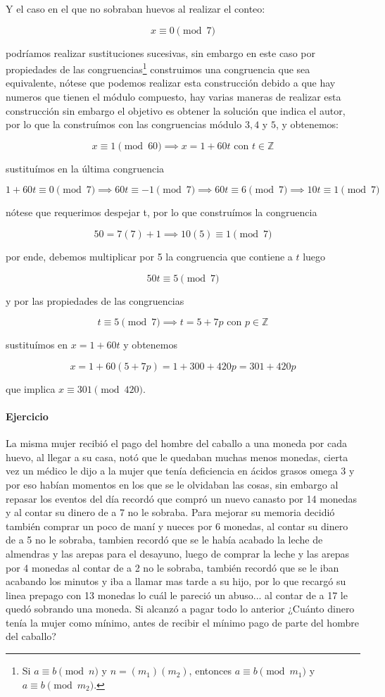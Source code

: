 \documentclass{article}
\begin{document}
	Y el caso en el que no sobraban huevos al realizar el conteo:
	
	$$x \equiv 0 \pmod{7}$$
	
	podríamos realizar sustituciones sucesivas, sin embargo en este caso por propiedades de las congruencias\footnote{Si $a \equiv b \pmod{n}$ y $n = (m_1)(m_2)$, entonces $a \equiv b \pmod{m_1}$ y $a \equiv b \pmod{m_2}$.} construimos una congruencia que sea equivalente, nótese que podemos realizar esta construcción debido a que hay numeros que tienen el módulo compuesto, hay varias maneras de realizar esta construcción sin embargo el objetivo es obtener la solución que indica el autor, por lo que la construímos con las congruencias módulo $3,4$ y $5$, y obtenemos:
	
	$$x \equiv 1 \pmod{60}  \implies x = 1 + 60t \text{ con } t \in \mathbb{Z}$$
	
	sustituímos en la última congruencia
	
	$$ 1 + 60t \equiv 0 \pmod{7} \implies 60t \equiv -1 \pmod{7} \implies 60t \equiv 6 \pmod{7} \implies 10t \equiv 1 \pmod{7}$$
	
	nótese que requerimos despejar t, por lo que construímos la congruencia
	
	$$50 = 7(7) + 1 \implies 10(5) \equiv 1 \pmod{7}$$
	
	por ende, debemos multiplicar por 5 la congruencia que contiene a $t$ luego
	
	$$50t \equiv 5 \pmod{7}$$
	
	y por las propiedades de las congruencias
	
	$$t \equiv 5 \pmod{7} \implies t = 5 + 7p \text{ con } p \in \mathbb{Z}$$
	
	sustituímos en $x = 1 + 60t$ y obtenemos
	
	$$x = 1 + 60(5 + 7p) = 1 + 300 + 420p = 301 + 420p$$
	
	que implica $x \equiv 301 \pmod{420}$.
	
	\paragraph{Ejercicio} La misma mujer recibió el pago del hombre del caballo a una moneda por cada huevo, al llegar a su casa, notó que le quedaban muchas menos monedas, cierta vez un médico le dijo a la mujer que tenía deficiencia en ácidos grasos omega 3 y por eso habían momentos en los que se le olvidaban las cosas, sin embargo al repasar los eventos del día recordó que compró un nuevo canasto por 14 monedas y al contar su dinero de a 7 no le sobraba. Para mejorar su memoria decidió también comprar un poco de maní y nueces por 6 monedas, al contar su dinero de a 5 no le sobraba, tambien recordó que se le había acabado la leche de almendras y las arepas para el desayuno, luego de comprar la leche y las arepas por 4 monedas al contar de a 2 no le sobraba, también recordó que se le iban acabando los minutos y iba a llamar mas tarde a su hijo, por lo que recargó su linea prepago con 13 monedas lo cuál le pareció un abuso... al contar de a 17 le quedó sobrando una moneda. Si alcanzó a pagar todo lo anterior ¿Cuánto dinero tenía la mujer como mínimo, antes de recibir el mínimo pago de parte del hombre del caballo?
	
\end{document}
